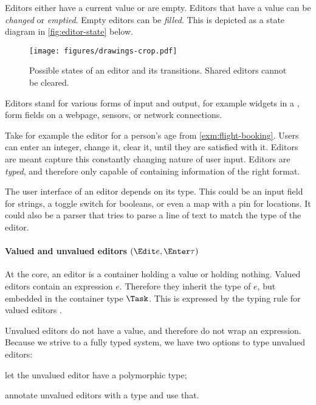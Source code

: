 Editors either have a current value or are empty.
Editors that have a value can be \emph{changed} or \emph{emptied}.
Empty editors can be \emph{filled}.
This is depicted as a state diagram in \autoref{fig:editor-state} below.

\begin{figure}[h]
  \centering
  \texttt{[image: figures/drawings-crop.pdf]}
  \caption{
    Possible states of an editor and its transitions.
    Shared editors cannot be cleared.
  }
  \label{fig:editor-state}
\end{figure}

Editors stand for various forms of input and output, for example widgets in a \GUI, form fields on a webpage, sensors, or network connections.

Take for example the editor for a person's age from \autoref{exm:flight-booking}.
Users can enter an integer, change it, clear it, until they are satisfied with it.
Editors are meant capture this constantly changing nature of user input.
Editors are \emph{typed}, and therefore only capable of containing information of the right format.

The user interface of an editor depends on its type.
This could be an input field for strings, a toggle switch for booleans, or even a map with a pin for locations.
It could also be a parser that tries to parse a line of text to match the type of the editor.


\paragraph{Valued and unvalued editors $(\Edit e, \Enter \tau)$}

At the core,
an editor is a container holding a value
or holding nothing.
Valued editors contain an expression $e$.
Therefore they inherit the type of $e$,
but embedded in the container type $\Task$.
This is expressed by the typing rule for valued editors .

Unvalued editors do not have a value,
and therefore do not wrap an expression.
Because we strive to a fully typed system,
we have two options to type unvalued editors:
\begin{enumerate*}
  \item let the unvalued editor have a polymorphic type;
  \item annotate unvalued editors with a type and use that. \label{itm:annotate}
\end{enumerate*}

